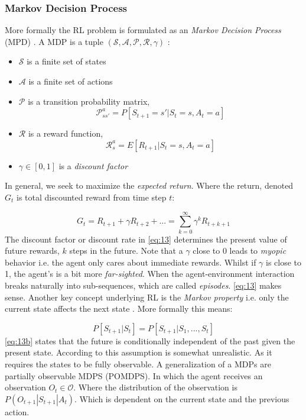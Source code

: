 \documentclass{kththesis}
\theoremstyle{definition}
\begin{document}
\subsubsection*{Markov Decision Process}
 More formally the RL problem is formulated as an \textit{Markov Decision Process} (MPD) \parencite{sutton1998reinforcement, li2017deep}. A MDP is a tuple $(\mathcal{S, A, P, R}, \gamma)$ \parencite{li2017deep}:
\begin{itemize}
    \item $\mathcal{S}$ is a finite set of states
    \item $\mathcal{A}$ is a finite set of actions
    \item $\mathcal{P}$ is a transition probability matrix, 
    \begin{equation} 
        \label{eq:12a}
        \mathcal{P}^{a}_{ss'} = P[S_{t+1} = s' | S_t =s, A_t = a]
    \end{equation}
    \item $\mathcal{R}$ is a reward function, 
    \begin{equation}
        \label{eq:12b}
        \mathcal{R}^{a}_{s} = E[R_{t+1} | S_t =s, A_t=a]
    \end{equation}
    \item $\gamma \in [0,1]$ is a \textit{discount factor} 
\end{itemize}
In general, we seek to maximize the \textit{expected return}. Where the return, denoted $G_t$ is total discounted reward from time step $t$:

\begin{equation}
    \label{eq:13}
    G_t = R_{t+1} + \gamma R_{t+2} + ... = \sum_{k=0}^{\infty}{\gamma^{k}R_{t+k+1}}
\end{equation}
The discount factor or discount rate in \autoref{eq:13} determines the present value of future rewards, $k$ steps in the future. Note that a $\gamma$ close to 0 leads to \textit{myopic} behavior i.e. the agent only cares about immediate rewards. Whilst if $\gamma$ is close to 1, the agent's is a bit more \textit{far-sighted}. When the agent-environment interaction breaks naturally into sub-sequences, which are called \textit{episodes}.
\autoref{eq:13} makes sense. Another key concept underlying RL is the \textit{Markov property} i.e. only the current state affects the next state \parencite{arulkumaran2017brief}. More formally this means:

\begin{equation}
    \label{eq:13b}
    P[S_{t+1} | S_t] = P[S_{t+1} | S_1, ..., S_t]
\end{equation}
\autoref{eq:13b} states that the future is conditionally independent of the past given the present state. According to \textcite{arulkumaran2017brief} this assumption is somewhat unrealistic. As it requires the states to be fully observable. A generalization of a MDPs are partially observable MDPS (POMDPS). In which the agent receives an observation $O_t \in \mathcal{O}$. Where the distribution of the observation is $P(O_{t+1} | S_{t+1} | A_t)$\parencite{arulkumaran2017brief}. Which is dependent on the current state and the previous action.
\end{document}
